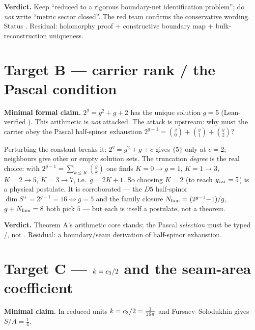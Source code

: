 \noindent\textbf{Verdict.} Keep ``reduced to a rigorous boundary-net identification problem''; do
\emph{not} write ``metric sector closed''. The red team confirms the conservative wording. Status
\mC. Residual: holomorphy proof $+$ constructive boundary map $+$ bulk-reconstruction uniqueness.

\section*{Target B --- carrier rank / the Pascal condition}\label{sec:B}
\noindent\textbf{Minimal formal claim.} $2^{g}=g^2+g+2$ has the unique solution $g=5$ (Lean-verified
\mE). This arithmetic is \emph{not} attacked. The attack is upstream: why must the carrier obey the
Pascal half-spinor exhaustion $2^{g-1}=\binom{g}{0}+\binom{g}{1}+\binom{g}{2}$?

\begin{keybox}
Perturbing the constant breaks it: $2^{g}=g^2+g+c$ gives $\{5\}$ only at $c=2$; neighbours give
other or empty solution sets. The truncation \emph{degree} is the real choice: with
$2^{g-1}=\sum_{k\le K}\binom{g}{k}$ one finds $K{=}0\!\to\!g{=}1$, $K{=}1\!\to\!3$,
$K{=}2\!\to\!5$, $K{=}3\!\to\!7$, i.e.\ $g=2K+1$. So choosing $K=2$ (to reach $g_{\mathrm{car}}=5$) is a
physical postulate. It is corroborated --- the $D5$ half-spinor $\dim S^+=2^{g-1}=16\Leftrightarrow g=5$
and the family closure $N_{\mathrm{fam}}=(2^{g-1}{-}1)/g$, $g+N_{\mathrm{fam}}=8$ both pick $5$ --- but each is itself a
postulate, not a theorem.
\end{keybox}

\noindent\textbf{Verdict.} Theorem A's arithmetic core stands; the Pascal \emph{selection} must be
typed \mO/\mC, not \mE. Residual: a boundary/seam derivation of half-spinor exhaustion.

\section*{Target C --- $k=c_3/2$ and the seam-area coefficient}\label{sec:C}
\noindent\textbf{Minimal claim.} In reduced units $k=c_3/2=\tfrac{1}{16\pi}$ and
Fursaev--Solodukhin gives $S/A=\tfrac14$.

